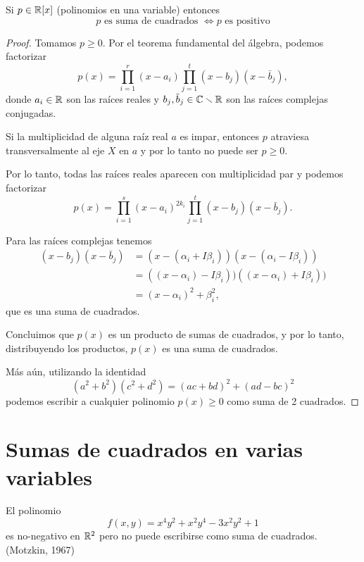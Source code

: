\begin{proposition}
Si $p \in \mathbb{R}[x]$ (polinomios en una variable) entonces
$$
p \text{ es suma de cuadrados } \iff p \text{ es positivo}
$$
\end{proposition}

\begin{proof}
Tomamos $p \ge 0$. Por el teorema fundamental del \'algebra, podemos factorizar
\[
p(x) = \prod_{i=1}^r (x-a_i) \prod_{j=1}^t (x-b_j)(x - \bar b_j),
\]
donde $a_i \in \mathbb{R}$ son las raíces reales y $b_j, \bar b_j \in \mathbb{C} \smallsetminus \mathbb{R}$ son las raíces complejas conjugadas.

Si la multiplicidad de alguna raíz real $a$ es impar, entonces $p$ atraviesa transversalmente al eje $X$ en $a$ y por lo tanto no puede ser $p \ge 0$.

Por lo tanto, todas las raíces reales aparecen con multiplicidad par y podemos factorizar
\[
p(x) = \prod_{i=1}^s (x-a_i)^{2k_i} \prod_{j=1}^t (x-b_j)(x - \bar b_j).
\]

Para las raíces complejas tenemos
\begin{align*}
(x-b_j)(x - \bar b_j) &= (x - (\alpha_i + I \beta_i  ))(x - (\alpha_i - I  \beta_i )) \\
&= ((x - \alpha_i) - I\beta_i  ))((x - \alpha_i) + I \beta_i  )) \\
&= (x - \alpha_i)^2 + \beta_i^2,
\end{align*}
que es una suma de cuadrados.

Concluimos que $p(x)$ es un producto de sumas de cuadrados, y por lo tanto, distribuyendo los productos, $p(x)$ es una suma de cuadrados.

Más aún, utilizando la identidad
\[
(a^2+b^2)(c^2+d^2) = (ac+bd)^2 + (ad-bc)^2
\]
podemos escribir a cualquier polinomio $p(x) \ge 0$ como suma de 2 cuadrados.

\end{proof}


\section{Sumas de cuadrados en varias variables}

\begin{prop}
El polinomio
\[
f(x, y) = x^4y^2 + x^2y^4 - 3x^2y^2+1
 \]
 es no-negativo en $\mathbb{R}^2$ pero no puede escribirse como suma de cuadrados. (Motzkin, 1967)
\end{prop}

